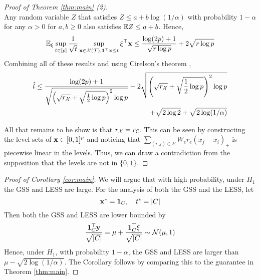 \begin{proof}[Proof of Theorem \ref{thm:main} (2)]
\[\]
Any random variable $Z$ that satisfies $Z \le a + b\log(1/\alpha)$ with probability $1 - \alpha$ for any $\alpha > 0$ for $a,b \ge 0$ also satisfies $\mathbb{E} Z \le a + b$. 
Hence,
\[
\mathbb{E}_\xi \sup_{t \in [p]} \frac 1{\sqrt{t}} \sup_{\mathbf{x} \in \mathcal{X}({\mathcal{T}}), {\bf 1}^\top \mathbf{x} \le t}  \xi^\top \mathbf{x} \le \frac{\log (2p) + 1}{\sqrt{r \log p} } + 2 \sqrt{r \log p}\\ 
\]
Combining all of these results and using Cirelson's theorem \cite{ledoux2001concentration},
\[
\begin{aligned}
\hat l \le \frac{\log (2p) + 1}{\sqrt{ \left(\sqrt{r_{\mathcal{X}}} + \sqrt{\frac 12 \log p} \right)^2 \log p} } + 2 \sqrt{\left(\sqrt{r_{\mathcal{X}}} + \sqrt{\frac 12 \log p} \right)^2 \log p} \\
+ \sqrt{2 \log 2} + \sqrt{2 \log( 1 / \alpha)}
\end{aligned}
\]

All that remains to be show is that $r_{\mathcal{X}} = r_{\mathcal{C}}$.
This can be seen by constructing the level sets of $\mathbf{x} \in [0,1]^p$ and noticing that $\sum_{(i,j) \in E} W_e r_e (x_j - x_i)_+$ is piecewise linear in the levels.
Thus, we can draw a contradiction from the supposition that the levels are not in $\{0,1\}$.
\end{proof}


\begin{proof}[Proof of Corollary \ref{cor:main}]

We will argue that with high probability, under $H_1$ the GSS and LESS are large.
For the analysis of both the GSS and the LESS, let 
\[
\mathbf{x}^* = {\bf 1}_C, \quad t^* = |C|
\]
Then both the GSS and LESS are lower bounded by
\[
\frac{{\bf 1}^\top_C \mathbf{y}}{\sqrt{|C|}} = \mu + \frac{{\bf 1}^\top_C \xi}{\sqrt{|C|}} \sim \mathcal{N}(\mu,1)
\]
Hence, under $H_1$, with probability $1 - \alpha$, the GSS and LESS are larger than $\mu - \sqrt{2 \log (1 / \alpha)}$.
The Corollary follows by comparing this to the guarantee in Theorem \ref{thm:main}.
\end{proof}
